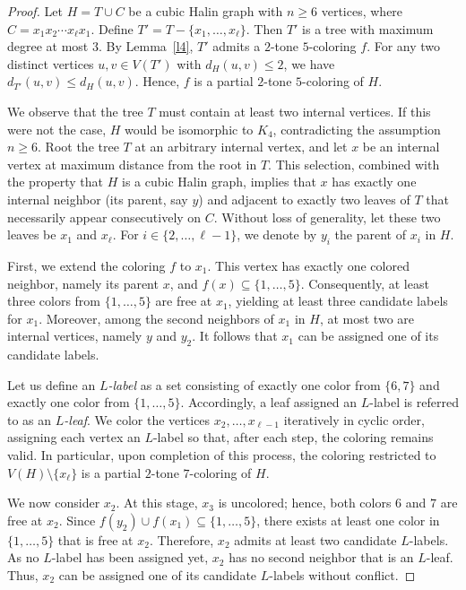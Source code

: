\documentclass[12pt]{article}
\numberwithin{theorem}{section}
\numberwithin{conjecture}{section}
\numberwithin{corollary}{section}
\numberwithin{example}{section}
\numberwithin{lemma}{section}
\numberwithin{proposition}{section}
\numberwithin{problem}{section}
\numberwithin{remark}{section}
\numberwithin{claim}{theorem}
\numberwithin{definition}{section}
\begin{document}
\begin{proof}

Let $H = T \cup C$ be a cubic Halin graph with $n \ge 6$ vertices, where $C = x_1 x_2 \cdots x_\ell x_1$. Define $T' = T -\{x_1, \dots, x_\ell\}$. Then $T'$ is a tree with maximum degree at most $3$. By Lemma~\ref{l4}, $T'$ admits a $2$-tone $5$-coloring $f$. For any two distinct vertices $u,v \in V(T')$ with $d_H(u,v)\le 2$, we have $d_{T'}(u,v)\le d_H(u,v)$. Hence, $f$ is a partial $2$-tone $5$-coloring of $H$.

\noindent We observe that the tree $T$ must contain at least two internal vertices. If this were not the case, $H$ would be isomorphic to $K_4$, contradicting the assumption $n \ge 6$. Root the tree $T$ at an arbitrary internal vertex, and let $x$ be an internal vertex at maximum distance from the root in $T$. This selection, combined with the property that $H$ is a cubic Halin graph, implies that $x$ has exactly one internal neighbor (its parent, say $y$) and adjacent to exactly two leaves of $T$ that necessarily appear consecutively on $C$. Without loss of generality, let these two leaves be $x_1$ and $x_\ell$. For $i \in \{2, \dots, \ell-1\}$, we denote by $y_i$ the parent of $x_i$ in $H$.

\noindent First, we extend the coloring $f$ to $x_1$. This vertex has exactly one colored neighbor, namely its parent $x$, and $f(x) \subseteq \{1,\dots,5\}$.
Consequently, at least three colors from $\{1,\dots,5\}$ are free at $x_1$, yielding at least three candidate labels for $x_1$. Moreover, among the second neighbors of $x_1$ in $H$, at most two are internal vertices, namely $y$ and $y_2$. It follows that $x_1$ can be assigned one of its candidate labels.

\noindent Let us define an \emph{$L$-label} as a set consisting of exactly one color from $\{6,7\}$ and exactly one color from $\{1,\dots,5\}$. Accordingly, a leaf assigned an $L$-label is referred to as an \emph{$L$-leaf}. We color the vertices $x_2,\dots,x_{\ell-1}$ iteratively in cyclic order, assigning each vertex an $L$-label so that, after each step, the coloring remains valid. In particular, upon completion of this process, the coloring restricted to $V(H)\setminus\{x_\ell\}$ is a partial $2$-tone $7$-coloring of $H$.

\noindent We now consider $x_2$. At this stage, $x_3$ is uncolored; hence, both colors $6$ and $7$ are free at $x_2$. Since $f(y_2) \cup f(x_1) \subseteq \{1,\dots,5\}$, there exists at least one color in $\{1,\dots,5\}$ that is free at $x_2$. Therefore, $x_2$ admits at least two candidate $L$-labels. As no $L$-label has been assigned yet, $x_2$ has no second neighbor that is an $L$-leaf. Thus, $x_2$ can be assigned one of its candidate $L$-labels without conflict.


\end{proof}
\end{document}
